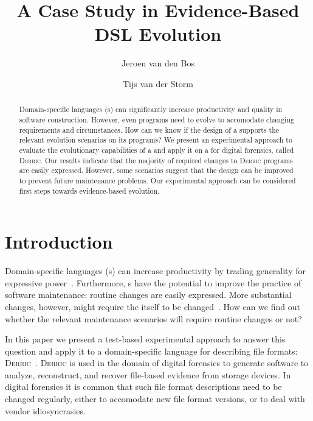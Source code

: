 \documentclass[a4paper]{llncs}
\def\derric{\textsc{Derric}\xspace}
\newcommand{\DSL}{\textsmaller{DSL}\xspace}
\begin{document}
\title{A Case Study in Evidence-Based DSL Evolution}

\author{Jeroen van den Bos \and Tijs van der Storm}

\maketitle

\begin{abstract}
Domain-specific languages (\DSL{}s) can significantly increase productivity and quality in software construction. 
However, even \DSL programs need to evolve to accomodate changing requirements and circumstances.
How can we know if the design of a \DSL supports the relevant evolution scenarios on its programs?
We present an experimental approach to evaluate the evolutionary capabilities of a \DSL and apply it on a \DSL for digital forensics, called \derric.
Our results indicate that the majority of required changes to \derric programs are easily expressed.
However, some scenarios suggest that the \DSL design can be improved to prevent future maintenance problems.
Our experimental approach can be considered first steps towards evidence-based \DSL evolution.
\end{abstract}

\section{Introduction\label{sect:introduction}}

\noindent
Domain-specific languages (\DSL{}s) can increase productivity by trading generality for expressive power~\cite{MernikEtAl05,vanDeursenEtAl00}.
Furthermore, \DSL{}s have the potential to improve the practice of software maintenance: routine changes are easily expressed. 
More substantial changes, however, might require the \DSL itself to be changed~\cite{vanDeursenKlint98}. 
How can we find out whether the relevant maintenance scenarios will require routine changes or not?

In this paper we present a test-based experimental approach to answer this question and apply it to a domain-specific language for describing file formats: \derric~\cite{derric_casestudy}.
\derric is used in the domain of digital forensics to generate software to analyze, reconstruct, and recover file-based evidence from storage devices.
In digital forensics it is common that such file format descriptions need to be changed regularly, either to accomodate new file format versions, or to deal with vendor idiosyncrasies. 
\end{document}
